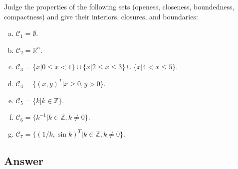 \documentclass[
	12pt, %
]{fphw}
\begin{document}
\begin{problem}
	Judge the properties of the following sets (openess, closeness, boundedness, compactness) and give their interiors, closures, and boundaries:
	
	\medskip
	
	\begin{enumerate}[a. ]
		\item $\mathcal{C}_1=\emptyset$.
		\item $\mathcal{C}_2=\mathbb{R}^n$.
		\item $\mathcal{C}_3=\{x|0\leq x<1\}\cup\{x|2\leq x \leq3\}\cup\{x|4<x \leq5\}$.
		\item $\mathcal{C}_4=\{(x,y)^T|x\geq 0,y> 0\}$.
		\item $\mathcal{C}_5=\{k|k\in \mathbb{Z}\}$.
		\item $\mathcal{C}_6=\{k^{-1}|k\in \mathbb{Z},k\neq 0\}$.
		\item $\mathcal{C}_7=\{(1/k,\sin{k})^T|k\in \mathbb{Z},k\neq 0\}$.
	
	\end{enumerate}
	
	\smallskip
\end{problem}


\subsection*{Answer} 
\end{document}
